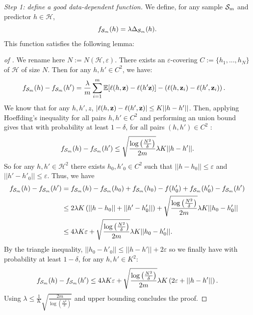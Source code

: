 \textit{Step 1: define a good data-dependent function.} We define, for any sample $\mathcal{S}_m$ and predictor $h\in \mathcal{H}$,
\[ f_{\mathcal{S}_m}(h) = \lambda \Delta_{\mathcal{S}_m}(h). \]
This function satisfies the following lemma:
\begin{proof}[of ]
We rename here $N:= N(\mathcal{H},\varepsilon)$. There exists an $\varepsilon$-covering $C:=\{h_1,...,h_N\}$ of $\mathcal{H}$ of size $N$.
Then for any $h,h'\in C^2$, we have:
\begin{align*}
f_{\mathcal{S}_m}(h)-f_{\mathcal{S}_m}(h')  & = \frac{\lambda}{m}\sum_{i=1}^m \mathbb{E}[\ell(h,\mathbf{z})-\ell(h'\mathbf{z})] - \left(\ell(h,\mathbf{z}_i)-\ell(h',\mathbf{z}_i)\right).
\end{align*}
We know that for any $h,h',z$, $|\ell(h,\mathbf{z})-\ell(h',\mathbf{z})| \leq K||h-h'||$. Then, applying Hoeffding's inequality for all pairs $h,h'\in C^2$ and performing an union bound gives that with probability at least $1-\delta$, for all pairs $(h,h')\in C^2$ :
\begin{align*}
f_{\mathcal{S}_m}(h)-f_{\mathcal{S}_m}(h')  \leq \sqrt{\frac{\log\left(\frac{N^2}{\delta}\right)}{2m}} \lambda K ||h-h'||.
\end{align*}
So for any $h,h'\in \mathcal{H}^2$ there exists $h_0,h'_0\in C^2$ such that $||h-h_0||\leq \varepsilon$ and $||h'-h'_0||\leq \varepsilon$. Thus, we have
\begin{align*}
f_{\mathcal{S}_m}(h)-f_{\mathcal{S}_m}(h')  & = f_{\mathcal{S}_m}(h)-f_{\mathcal{S}_m}(h_0) + f_{\mathcal{S}_m}(h_0)-f(h'_0)+ f_{\mathcal{S}_m}(h'_0)-f_{\mathcal{S}_m}(h') \\
& \leq 2\lambda K \left(||h-h_0|| + ||h'-h'_0||\right) + \sqrt{\frac{\log\left(\frac{N^2}{\delta}\right)}{2m}} \lambda K ||h_0-h_0'|| \\
& \leq 4\lambda K \varepsilon + \sqrt{\frac{\log\left(\frac{N^2}{\delta}\right)}{2m}} \lambda K ||h_0-h'_0||.
\end{align*}
By the triangle inequality, $||h_0-h'_0||\leq ||h-h'|| + 2\varepsilon$ so we finally have with probability at least $1-\delta$, for any $h,h'\in K^2$:
\[  f_{\mathcal{S}_m}(h)-f_{\mathcal{S}_m}(h') \leq 4\lambda K \varepsilon + \sqrt{\frac{\log\left(\frac{N^2}{\delta}\right)}{2m}} \lambda K \left( 2\varepsilon+ ||h-h'||\right).\]
Using $\lambda \leq \frac{1}{K}\sqrt{\frac{2m}{\log\left(\frac{N^2}{\delta}\right)}}$ and upper bounding concludes the proof.
\end{proof}

